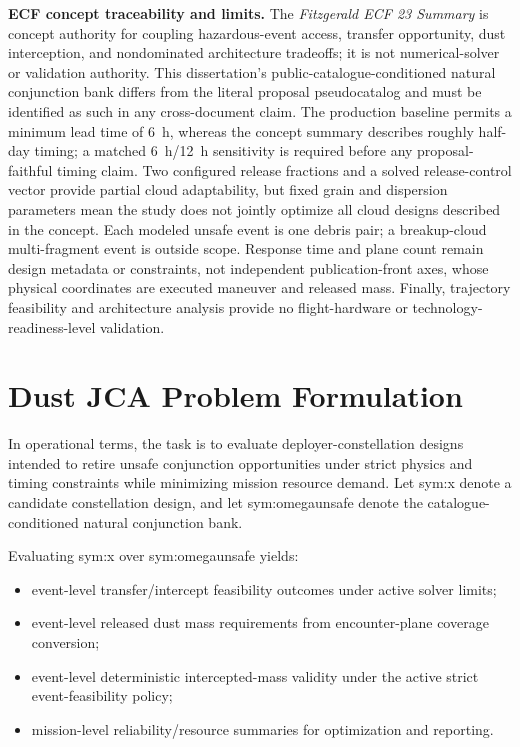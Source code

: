     \noindent\textbf{ECF concept traceability and limits.} The \emph{Fitzgerald ECF 23 Summary} is concept authority for coupling hazardous-event access, transfer opportunity, dust interception, and nondominated architecture tradeoffs; it is not numerical-solver or validation authority. This dissertation's public-catalogue-conditioned natural conjunction bank differs from the literal proposal pseudocatalog and must be identified as such in any cross-document claim. The production baseline permits a minimum lead time of \SI{6}{h}, whereas the concept summary describes roughly half-day timing; a matched \SI{6}{h}/\SI{12}{h} sensitivity is required before any proposal-faithful timing claim. Two configured release fractions and a solved release-control vector provide partial cloud adaptability, but fixed grain and dispersion parameters mean the study does not jointly optimize all cloud designs described in the concept. Each modeled unsafe event is one debris pair; a breakup-cloud multi-fragment event is outside scope. Response time and plane count remain design metadata or constraints, not independent publication-front axes, whose physical coordinates are executed maneuver and released mass. Finally, trajectory feasibility and architecture analysis provide no flight-hardware or technology-readiness-level validation.

\section{Dust JCA Problem Formulation} \label{se:problem_formulation}
    In operational terms, the task is to evaluate deployer-constellation designs intended to retire unsafe conjunction opportunities under strict physics and timing constraints while minimizing mission resource demand. Let \gls{sym:x} denote a candidate constellation design, and let \gls{sym:omegaunsafe} denote the catalogue-conditioned natural conjunction bank.

    Evaluating \gls{sym:x} over \gls{sym:omegaunsafe} yields:
    \begin{itemize}[leftmargin=*]
        \item event-level transfer/intercept feasibility outcomes under active solver limits;
        \item event-level released dust mass requirements from encounter-plane coverage conversion;
        \item event-level deterministic intercepted-mass validity under the active strict event-feasibility policy;
        \item mission-level reliability/resource summaries for optimization and reporting.
    \end{itemize}

